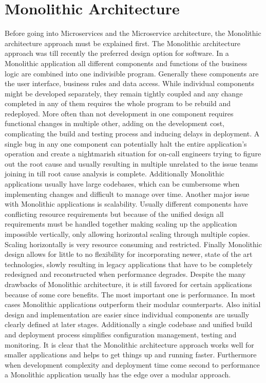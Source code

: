 \documentclass[greek,english]{article}
\begin{document}
\tableofcontents

\section{Monolithic Architecture}

Before going into Microservices and the Microservice architecture, the Monolithic architecture approach must be explained first. The Monolithic architecture approach was till recently the preferred design option for software. In a Monolithic application all different components and functions of the business logic are combined into one indivisible program\cite{monovsmicro}. Generally these components are the user interface, business rules and data access. While individual components might be developed separately, they remain tightly coupled\cite{whatismono} and any change completed in any of them requires the whole program to be rebuild and redeployed\cite{app10175797}. More often than not development in one component requires functional changes in multiple other, adding on the development cost, complicating the build and testing process and inducing delays in deployment. A single bug in any one component can potentially halt the entire application's operation and create a nightmarish situation for on-call engineers trying to figure out the root cause and usually resulting in multiple unrelated to the issue teams joining in till root cause analysis is complete. Additionally Monolithic applications usually have large codebases, which can be cumbersome when implementing changes and difficult to manage over time\cite{whatismono}. Another major issue with Monolithic applications is scalability. Usually different components have conflicting resource requirements but because of the unified design all requirements must be handled together making scaling up the application impossible vertically, only allowing horizontal scaling through multiple copies. Scaling horizontally is very resource consuming and restricted. Finally Monolithic design allows for little to no flexibility for incorporating newer, state of the art technologies, slowly resulting in legacy applications that have to be completely redesigned and reconstructed when performance degrades. Despite the many drawbacks of Monolithic architecture, it is still favored for certain applications because of some core benefits. The most important one is performance. In most cases Monolithic applications outperform their modular counterparts\cite{whatismono}. Also initial design and implementation are easier since individual components are usually clearly defined at later stages. Additionally a single codebase and unified build and deployment process simplifies configuration management, testing and monitoring\cite{whatismono}. It is clear that the Monolithic architecture approach works well for smaller applications and helps to get things up and running faster. Furthermore when development complexity and deployment time come second to performance a Monolithic application usually has the edge over a modular approach.
\end{document}
